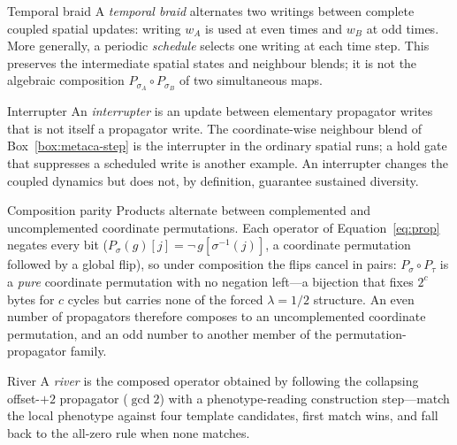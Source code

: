 \documentclass[man,12pt,floatsintext,donotrepeattitle]{apa7}
\newcommand{\sig}{\sigma}
\begin{document}
\begin{definition}[label={def:braid}]{Temporal braid}
A \emph{temporal braid} alternates two writings between complete coupled spatial
updates: writing $w_A$ is used at even times and $w_B$ at odd times. More
generally, a periodic \emph{schedule} selects one writing at each time step.
This preserves the intermediate spatial states and neighbour blends; it is not
the algebraic composition $P_{\sigma_A}\circ P_{\sigma_B}$ of two simultaneous
maps.
\end{definition}

\begin{definition}[label={def:interrupter}]{Interrupter}
An \emph{interrupter} is an update between elementary propagator writes that is
not itself a propagator write. The coordinate-wise neighbour blend of
Box~\ref{box:metaca-step} is the interrupter in the ordinary spatial runs; a
hold gate that suppresses a scheduled write is another example. An interrupter
changes the coupled dynamics but does not, by definition, guarantee sustained
diversity.
\end{definition}

\begin{proposition}[label={obs:flat}]{Composition parity}
Products alternate between complemented and uncomplemented coordinate permutations.
Each operator of Equation~\eqref{eq:prop} negates every bit
($P_\sig(g)[j] = \lnot\,g[\sig^{-1}(j)]$, a coordinate permutation followed by a
global flip), so under composition the flips cancel in pairs: $P_\sig \circ
P_\tau$ is a \emph{pure} coordinate permutation with no negation left---a
bijection that fixes $2^{c}$ bytes for $c$ cycles but carries none of the forced
$\lambda = 1/2$ structure. An even number of propagators therefore composes to
an uncomplemented coordinate permutation, and an odd number to another member
of the permutation-propagator family.
\end{proposition}

\begin{definition}[label={def:river}]{River}
A \emph{river} is the composed operator obtained by following the collapsing
offset-$+2$ propagator ($\gcd 2$) with a phenotype-reading construction
step---match the local phenotype against four template candidates, first match
wins, and fall back to the all-zero rule when none matches.
\end{definition}
\end{document}

